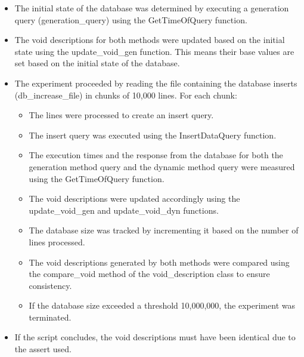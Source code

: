 \begin{itemize}
    \item The initial state of the database was determined by executing a generation query (generation\_query) using the GetTimeOfQuery function.

    \item The \gls{void} descriptions for both methods were updated based on the initial state using the update\_void\_gen function. This means their base values are set based on the initial state of the database.

    \item The experiment proceeded by reading the file containing the database inserts (db\_increase\_file) in chunks of 10,000 lines. For each chunk:

          \begin{itemize}
              \item The lines were processed to create an insert query.

              \item The insert query was executed using the InsertDataQuery function.

              \item The execution times and the response from the database for both the generation method query and the dynamic method query were measured using the GetTimeOfQuery function.

              \item The \gls{void} descriptions were updated accordingly using the update\_void\_gen and update\_void\_dyn functions.

              \item The database size was tracked by incrementing it based on the number of lines processed.

              \item The \gls{void} descriptions generated by both methods were compared using the compare\_void method of the void\_description class to ensure consistency.

              \item If the database size exceeded a threshold 10,000,000, the experiment was terminated.
          \end{itemize}

    \item If the script concludes, the \gls{void} descriptions must have been identical due to the assert used.
\end{itemize}


